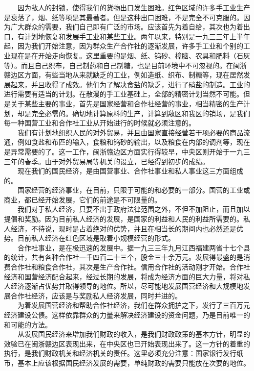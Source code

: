 \documentclass[cn,11pt,chinese]{elegantbook}
\begin{document}
　　因为敌人的封锁，使得我们的货物出口发生困难。红色区域的许多手工业生产是衰落了，烟、纸等项是其最著者。但是这种出口困难，不是完全不可克服的。因为广大群众的需要，我们自己即有广泛的市场。应该首先为着自给，其次也为着出口，有计划地恢复和发展手工业和某些工业。两年以来，特别是一九三三年上半年起，因为我们开始注意，因为群众生产合作社的逐渐发展，许多手工业和个别的工业现在是在开始走向恢复。这里重要的是烟、纸、钨砂、樟脑、农具和肥料（石灰等）。而且自己织布，自己制药和自己制糖，也是目前环境中不可忽视的。在闽浙赣边区方面，有些当地从来就缺乏的工业，例如造纸、织布、制糖等，现在居然发展起来，并且收得了成效。他们为了解决食盐的缺乏，进行了硝盐的制造。工业的进行需要有适当的计划。在散漫的手工业基础上，全部的精密计划当然不可能。但是关于某些主要的事业，首先是国家经营和合作社经营的事业，相当精密的生产计划，却是完全必需的。确切地计算原料的生产，计算到敌区和我区的销场，是我们每一种国营工业和合作社工业从开始进行的时候就必须注意的。\\
　　我们有计划地组织人民的对外贸易，并且由国家直接经营若干项必要的商品流通，例如食盐和布匹的输入，食粮和钨砂的输出，以及粮食在内部的调剂等，现在是异常需要的了。这一工作，闽浙赣边区方面实行得较早，中央区则开始于一九三三年的春季。由于对外贸易局等机关的设立，已经得到初步的成绩。\\
　　现在我们的国民经济，是由国营事业、合作社事业和私人事业这三方面组成的。\\
　　国家经营的经济事业，在目前，只限于可能的和必要的一部分。国营的工业或商业，都已经开始发展，它们的前途是不可限量的。\\
　　我们对于私人经济，只要不出于政府法律范围之外，不但不加阻止，而且加以提倡和奖励。因为目前私人经济的发展，是国家的利益和人民的利益所需要的。私人经济，不待说，现时是占着绝对的优势，并且在相当长的期间内也必然还是优势。目前私人经济在红色区域是取着小规模经营的形式。\\
　　合作社事业，是在极迅速的发展中。据一九三三年九月江西福建两省十七个县的统计，共有各种合作社一千四百二十三个，股金三十余万元。发展得最盛的是消费合作社和粮食合作社，其次是生产合作社。信用合作社的活动刚才开始。合作社经济和国营经济配合起来，经过长期的发展，将成为经济方面的巨大力量，将对私人经济逐渐占优势并取得领导的地位。所以，尽可能地发展国营经济和大规模地发展合作社经济，应该是与奖励私人经济发展，同时并进的。\\
　　为着发展国营经济和帮助合作社经济，我们在群众拥护之下，发行了三百万元经济建设公债。这样依靠群众的力量来解决经济建设的资金问题，乃是目前唯一的和可能的方法。\\
　　从发展国民经济来增加我们财政的收入，是我们财政政策的基本方针，明显的效验已在闽浙赣边区表现出来，在中央区也已开始表现出来了。这一方针的着重的执行，是我们财政机关和经济机关的责任。这里必须充分注意：国家银行发行纸币，基本上应该根据国民经济发展的需要，单纯财政的需要只能放在次要的地位。\\
\end{document}

